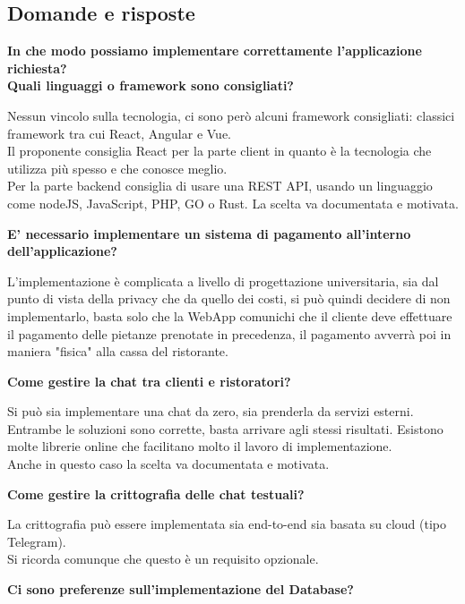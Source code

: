 \documentclass[a4paper, 11pt]{article}
\begin{document}
\subsection{Domande e risposte}

\textbf{In che modo possiamo implementare correttamente l’applicazione richiesta?  \\
Quali linguaggi o framework sono consigliati?}

Nessun vincolo sulla tecnologia, ci sono però alcuni framework consigliati: classici framework tra cui React, Angular e Vue. \\ 
Il proponente consiglia React per la parte client in quanto è la tecnologia che utilizza più spesso e che conosce meglio. \\
Per la parte backend consiglia di usare una REST API, usando un linguaggio come nodeJS, JavaScript, PHP, GO o Rust. La scelta va documentata e motivata.\newline

\textbf{E’ necessario implementare un sistema di pagamento all’interno dell’applicazione?}

L'implementazione è complicata a livello di progettazione universitaria, 
sia dal punto di vista della privacy che da quello dei costi, si può quindi decidere di non implementarlo, basta solo che la WebApp comunichi che il cliente deve effettuare il pagamento delle pietanze prenotate in precedenza, il pagamento avverrà poi in maniera "fisica" alla cassa del ristorante. \newline 

\textbf{Come gestire la chat tra clienti e ristoratori?}

Si può sia implementare una chat da zero, sia prenderla da servizi esterni. Entrambe le soluzioni sono corrette, basta arrivare agli stessi risultati.
Esistono molte librerie online che facilitano molto il lavoro di implementazione. \\
Anche in questo caso la scelta va documentata e motivata.\newline

\textbf{Come gestire la crittografia delle chat testuali?}

La crittografia può essere implementata sia end-to-end sia basata su cloud (tipo Telegram). \\
Si ricorda comunque che questo è un requisito opzionale.\newline

\textbf{Ci sono preferenze sull'implementazione del Database?}
\end{document}
